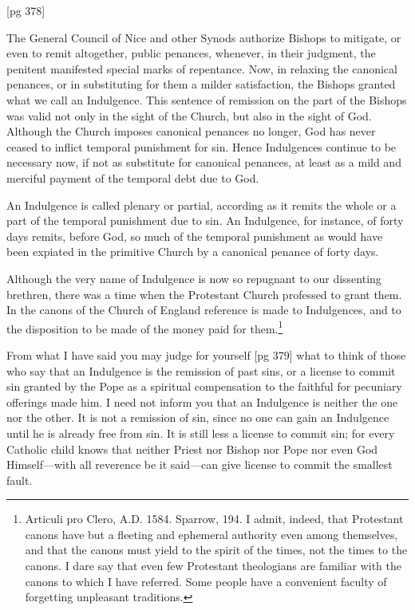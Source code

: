 [pg 378]

The General Council of Nice and other Synods
authorize Bishops to mitigate, or even to remit
altogether, public penances, whenever, in their
judgment, the penitent manifested special marks
of repentance. Now, in relaxing the canonical penances,
or in substituting for them a milder satisfaction,
the Bishops granted what we call an Indulgence.
This sentence of remission on the part
of the Bishops was valid not only in the sight of
the Church, but also in the sight of God. Although
the Church imposes canonical penances no
longer, God has never ceased to inflict temporal
punishment for sin. Hence Indulgences continue
to be necessary now, if not as substitute for canonical
penances, at least as a mild and merciful
payment of the temporal debt due to God.

An Indulgence is called plenary or partial, according
as it remits the whole or a part of the
temporal punishment due to sin. An Indulgence,
for instance, of forty days remits, before God, so
much of the temporal punishment as would have
been expiated in the primitive Church by a canonical
penance of forty days.

Although the very name of Indulgence is now
so repugnant to our dissenting brethren, there was
a time when the Protestant Church professed to
grant them. In the canons of the Church of England
reference is made to Indulgences, and to the
disposition to be made of the money paid for
them.\footnote{Articuli pro Clero, A.D.
1584. Sparrow, 194. I admit, indeed,
that Protestant canons have but a fleeting and ephemeral
authority even among themselves, and that the canons must
yield to the spirit of the times, not the times to the canons. I
dare say that even few Protestant theologians are familiar with
the canons to which I have referred. Some people have a convenient
faculty of forgetting unpleasant traditions.}

From what I have said you may judge for yourself
[pg 379]
what to think of those who say that an Indulgence
is the remission of past sins, or a license
to commit sin granted by the Pope as a spiritual
compensation to the faithful for pecuniary offerings
made him. I need not inform you that an
Indulgence is neither the one nor the other. It is
not a remission of sin, since no one can gain an
Indulgence until he is already free from sin. It
is still less a license to commit sin; for every
Catholic child knows that neither Priest nor
Bishop nor Pope nor even God Himself—with all
reverence be it said—can give license to commit
the smallest fault.

